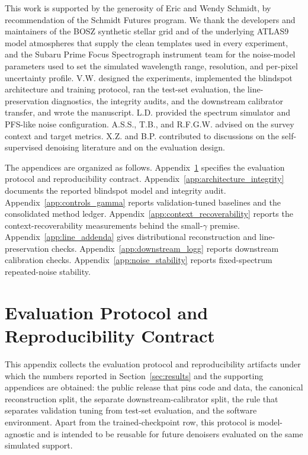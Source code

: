 \documentclass[twocolumn]{aastex7}
\newcounter{protocol}
\begin{document}
\begin{acknowledgments}
This work is supported by the generosity of Eric and Wendy Schmidt, by recommendation of the Schmidt Futures program. We thank the developers and maintainers of the BOSZ synthetic stellar grid \citep{Bohlin2017} and of the underlying ATLAS9 model atmospheres \citep{Kurucz1979,Meszaros2012} that supply the clean templates used in every experiment, and the Subaru Prime Focus Spectrograph instrument team for the noise-model parameters used to set the simulated wavelength range, resolution, and per-pixel uncertainty profile. V.W. designed the experiments, implemented the blindspot architecture and training protocol, ran the test-set evaluation, the line-preservation diagnostics, the integrity audits, and the downstream calibrator transfer, and wrote the manuscript. L.D. provided the spectrum simulator and PFS-like noise configuration. A.S.S., T.B., and R.F.G.W. advised on the survey context and target metrics. X.Z. and B.P. contributed to discussions on the self-supervised denoising literature and on the evaluation design.
\end{acknowledgments}


\appendix

\noindent The appendices are organized as follows. Appendix~\ref{app:contract} specifies the evaluation protocol and reproducibility contract. Appendix~\ref{app:architecture_integrity} documents the reported blindspot model and integrity audit. Appendix~\ref{app:controls_gamma} reports validation-tuned baselines and the consolidated method ledger. Appendix~\ref{app:context_recoverability} reports the context-recoverability measurements behind the small-$\gamma$ premise. Appendix~\ref{app:line_addenda} gives distributional reconstruction and line-preservation checks. Appendix~\ref{app:downstream_logg} reports downstream calibration checks. Appendix~\ref{app:noise_stability} reports fixed-spectrum repeated-noise stability.

\section{Evaluation Protocol and Reproducibility Contract}
\label{app:contract}

This appendix collects the evaluation protocol and reproducibility artifacts under which the numbers reported in Section~\ref{sec:results} and the supporting appendices are obtained: the public release that pins code and data, the canonical reconstruction split, the separate downstream-calibrator split, the rule that separates validation tuning from test-set evaluation, and the software environment. Apart from the trained-checkpoint row, this protocol is model-agnostic and is intended to be reusable for future denoisers evaluated on the same simulated support.
\end{document}
